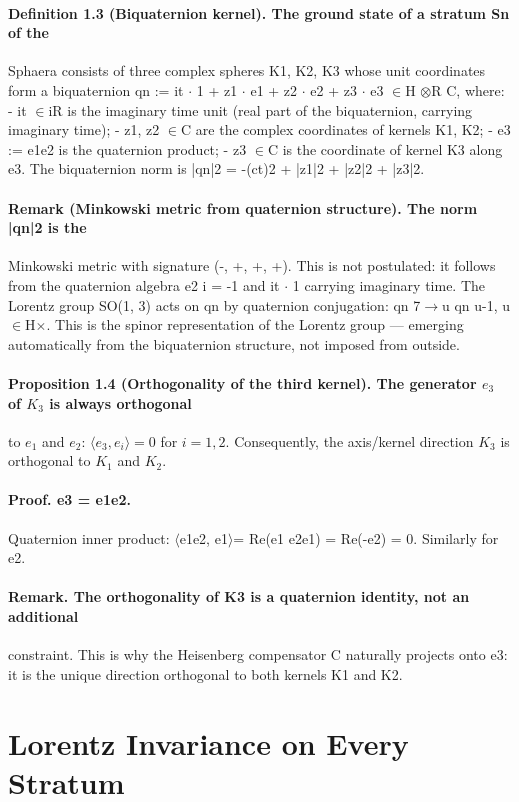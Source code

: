 \documentclass[12pt,a4paper]{article}
\begin{document}
\paragraph*{Definition 1.3 (Biquaternion kernel). The ground state of a stratum Sn of the}
Sphaera consists of three complex spheres K1, K2, K3 whose unit coordinates form a biquaternion qn := it $\cdot$ 1 + z1 $\cdot$ e1 + z2 $\cdot$ e2 + z3 $\cdot$ e3 $\in$H $\otimes$R C, where:
- it $\in$iR is the imaginary time unit (real part of the biquaternion, carrying
imaginary time);
- z1, z2 $\in$C are the complex coordinates of kernels K1, K2;
- e3 := e1e2 is the quaternion product;
- z3 $\in$C is the coordinate of kernel K3 along e3.
The biquaternion norm is |qn|2 = -(ct)2 + |z1|2 + |z2|2 + |z3|2.
\paragraph*{Remark (Minkowski metric from quaternion structure). The norm |qn|2 is the}
Minkowski metric with signature (-, +, +, +). This is not postulated: it follows from the quaternion algebra e2 i = -1 and it $\cdot$ 1 carrying imaginary time. The Lorentz group SO(1, 3) acts on qn by quaternion conjugation: qn 7$\to$u qn u-1, u $\in$H$\times$. This is the spinor representation of the Lorentz group --- emerging automatically from the biquaternion structure, not imposed from outside.
\paragraph*{Proposition 1.4 (Orthogonality of the third kernel). The generator $e_3$ of $K_3$ is always orthogonal}
to $e_1$ and $e_2$: $\langle e_3, e_i\rangle = 0$ for $i=1,2$. Consequently, the axis/kernel direction $K_3$ is orthogonal to $K_1$ and $K_2$.
\paragraph*{Proof. e3 = e1e2.}
Quaternion inner product: $\langle$e1e2, e1$\rangle$= Re(e1 e2e1) = Re(-e2) = 0. Similarly for e2.
\paragraph*{Remark. The orthogonality of K3 is a quaternion identity, not an additional}
constraint. This is why the Heisenberg compensator C naturally projects onto e3: it is the unique direction orthogonal to both kernels K1 and K2.

\section{Lorentz Invariance on Every Stratum}
\end{document}

